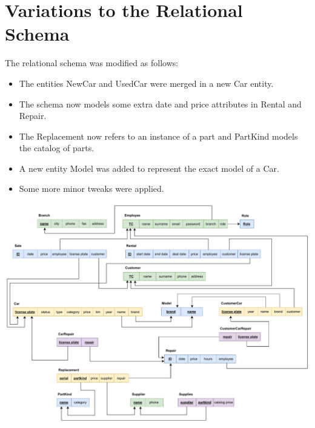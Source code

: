 \section{Variations to the Relational Schema}
The relational schema was modified as follows:
\begin{itemize}
	\item The entities NewCar and UsedCar were merged in a new Car entity.
	\item The schema now models some extra date and price attributes in Rental and Repair.
	\item The Replacement now refers to an instance of a part and PartKind models the catalog of parts.
	\item A new entity Model was added to represent the exact model of a Car.
	\item Some more minor tweaks were applied.
\end{itemize}

\vspace{10px}

\includegraphics[scale=0.55]{new_relational.drawio.pdf}